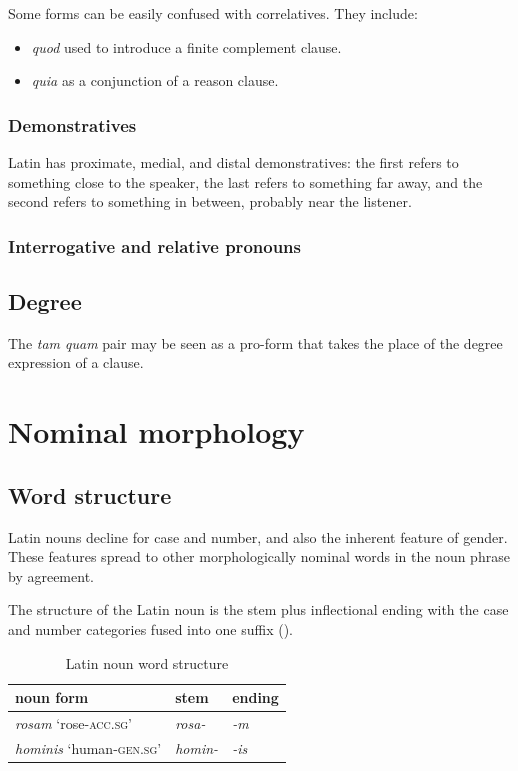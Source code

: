 \documentclass[a4paper, oneside, 12pt]{report}
\newcommand{\form}[1]{\emph{#1}}
\newcommand*{\category}[1]{\textsc{#1}}
\newcommand{\translate}[1]{`#1'}
\begin{document}
Some forms can be easily confused with correlatives.
They include:
\begin{itemize}
    \item \form{quod} used to introduce a finite complement clause.
    \item \form{quia} as a conjunction of a reason clause.
\end{itemize}

\subsection{Demonstratives}

Latin has proximate, medial, and distal demonstratives:
the first refers to something close to the speaker, 
the last refers to something far away,
and the second refers to something in between,
probably near the listener.

\subsection{Interrogative and relative pronouns}

\section{Degree}

The \form{tam quam} pair may be seen as a pro-form that takes the place of the degree expression of a clause.

\chapter{Nominal morphology}

\section{Word structure}\label{sec:noun.paradigm.introduction}

Latin nouns decline for case and number,
and also the inherent feature of gender.
These features spread to other morphologically nominal words in the noun phrase by agreement.

The structure of the Latin noun is the stem plus inflectional ending 
with the case and number categories fused into one suffix ().

\begin{table}[H]
\caption{Latin noun word structure}
\label{tbl:noun-structure}
\centering
\begin{tabular}{lll}
\toprule
noun form & stem & ending \\
\midrule
 \form{rosam} \translate{rose-\category{acc.sg}} & \form{rosa-} & \form{-m} \\
 \form{hominis} \translate{human-\category{gen.sg}} & \form{homin-} & \form{-is} \\ 
\bottomrule
\end{tabular}
\end{table}
\end{document}

